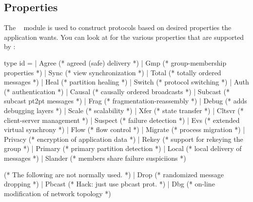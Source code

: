 \subsection{Properties}
\label{sec:properties}

The \ensemble\  module is used to construct protocols based on
desired properties the application wants.  You can look at 
for the various properties that are supported by \ensemble:
\begin{codebox}
type id =
  | Agree				(* agreed (safe) delivery *)
  | Gmp					(* group-membership properties *)
  | Sync				(* view synchronization *)
  | Total				(* totally ordered messages *)
  | Heal				(* partition healing *)
  | Switch		  (* protocol switching *)
  | Auth				(* authentication *)
  | Causal			(* causally ordered broadcasts *)
  | Subcast			(* subcast pt2pt messages *)
  | Frag				(* fragmentation-reassembly *)
  | Debug				(* adds debugging layers *)
  | Scale				(* scalability *)
  | Xfer				(* state transfer *)
  | Cltsvr			(* client-server management *)
  | Suspect			(* failure detection *)
  | Evs					(* extended virtual synchrony *)
  | Flow				(* flow control *)
  | Migrate			(* process migration *)
  | Privacy			(* encryption of application data *)
  | Rekey				(* support for rekeying the group *)
  | Primary			(* primary partition detection *)
  | Local				(* local delivery of messages *)
  | Slander			(* members share failure suspiciions *)

    (* The following are not normally used.
     *)
  | Drop				(* randomized message dropping *)
  | Pbcast			(* Hack: just use pbcast prot. *)
  | Dbg         (* on-line modification of network topology *)
\end{codebox}

